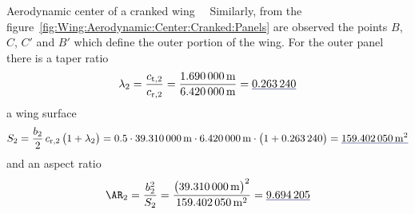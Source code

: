 \documentclass[[12pt,twoside]{book}
\begin{document}
\begin{myExampleX}{Aerodynamic center of a cranked wing}{\ \myIconGraph\ }
Similarly, from the figure~\ref{fig:Wing:Aerodynamic:Center:Cranked:Panels} are observed
the points $B$, $C$, $C'$ and $B'$ which define the outer portion of the wing.
For the outer panel there is a taper ratio
\[
\lambda_2
  =\frac{c_{\mathrm{t},2}}{c_{\mathrm{r},2}}
  =\frac{\SI[round-precision=2]{\myChordTipWingIIMT}{\metre}}{\SI[round-precision=2]{\myChordRootWingIIMT}{\metre}}
  =\mathunderline{mydarkblue}{ \SI[round-precision=2]{\myTaperRatioWingII}{} }
\]
a wing surface
\[
S_2 = \frac{b_2}{2} \, c_{\mathrm{r},2} \, \big( 1 + \lambda_2 \big)
  =
    \num{0.5} \cdot \SI[round-precision=1]{\mySpanWingIIMT}{\metre}
      \cdot \SI[round-precision=2]{\myChordRootWingIIMT}{\metre}
      \cdot \big( 1 + \SI[round-precision=2]{\myTaperRatioWingII}{} \big) 
    = \mathunderline{mydarkblue}{ \SI[round-precision=1]{\myAreaWingIIMTsquared}{\metre^2} }
\]
and an aspect ratio
\[
\AR_2 
  = \frac{b_2^2}{S_2}
  = \frac{\big(\SI[round-precision=1]{\mySpanWingIIMT}{\metre}\big)^2}{\SI[round-precision=1]{\myAreaWingIIMTsquared}{\metre^2}}
  = \mathunderline{mydarkblue}{ \num[round-precision=2]{\myAspectRatioWingII} }
\]


\end{myExampleX}
\end{document}
